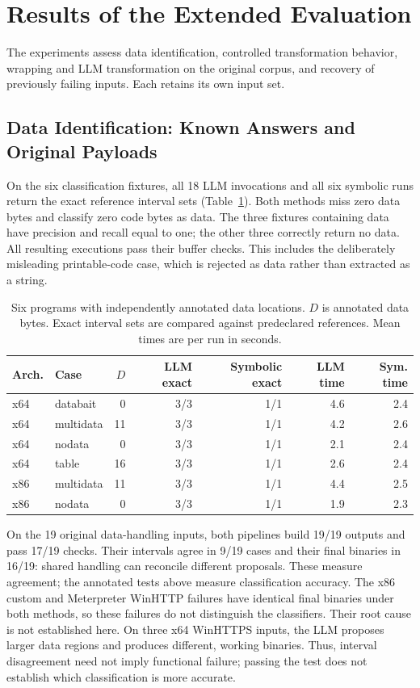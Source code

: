 \section{Results of the Extended Evaluation}\label{sec:extended_results}
The experiments assess data identification, controlled transformation
behavior, wrapping and LLM transformation on the original corpus, and
recovery of previously failing inputs. Each retains its own input set.

\subsection{Data Identification: Known Answers and Original Payloads}
On the six classification fixtures, all 18 LLM invocations and all
six symbolic runs return the exact reference interval sets
(Table~\ref{tab:new_classifier}). Both methods miss zero data bytes and
classify zero code bytes as data. The three fixtures containing data have
precision and recall equal to one; the other three correctly return no
data. All resulting executions pass their buffer checks. This includes
the deliberately misleading printable-code case, which is rejected as
data rather than extracted as a string.


\begin{table}[t]
\caption{Six programs with independently annotated data locations. $D$ is annotated data bytes.
Exact interval sets are compared against predeclared references.
Mean times are per run in seconds.}
\label{tab:new_classifier}
\centering\small\setlength{\tabcolsep}{4pt}
\begin{tabular}{@{}llrrrrr@{}}
\toprule
Arch. & Case & $D$ & LLM exact & Symbolic exact & LLM time & Sym. time \\
\midrule
x64 & databait & 0 & 3/3 & 1/1 & 4.6 & 2.4 \\
x64 & multidata & 11 & 3/3 & 1/1 & 4.2 & 2.6 \\
x64 & nodata & 0 & 3/3 & 1/1 & 2.1 & 2.4 \\
x64 & table & 16 & 3/3 & 1/1 & 2.6 & 2.4 \\
x86 & multidata & 11 & 3/3 & 1/1 & 4.4 & 2.5 \\
x86 & nodata & 0 & 3/3 & 1/1 & 1.9 & 2.3 \\
\bottomrule
\end{tabular}
\end{table}


On the 19 original data-handling inputs, both pipelines build 19/19
outputs and pass 17/19 checks. Their intervals agree in 9/19 cases and
their final binaries in 16/19: shared handling can reconcile different
proposals. These measure agreement; the annotated tests above measure
classification accuracy. The x86 custom and Meterpreter WinHTTP failures
have identical final binaries under both methods, so these failures do not
distinguish the classifiers. Their root cause is not established here.
On three x64 WinHTTPS inputs, the LLM proposes larger data regions and
produces different, working binaries. Thus, interval disagreement need not
imply functional failure; passing the test does not establish which
classification is more accurate.


